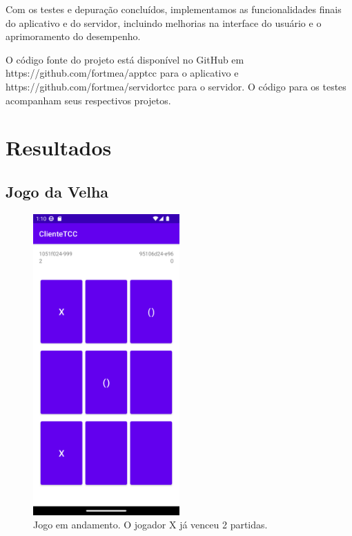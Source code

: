 \documentclass[12pt]{article}
\begin{document}
Com os testes e depuração concluídos, implementamos as funcionalidades finais do aplicativo e do servidor, incluindo melhorias na interface do usuário e o aprimoramento do desempenho.

O código fonte do projeto está disponível no GitHub em  https://github.com/fortmea/apptcc para o aplicativo e https://github.com/fortmea/servidortcc para o servidor. O código para os testes acompanham seus respectivos projetos.

\section{Resultados}
\subsection{Jogo da Velha}
\begin{figure}[ht]
\centering
\includegraphics[width=0.5\textwidth]{tela_jogo.png}
\caption{Jogo em andamento. O jogador X já venceu 2 partidas.}
\label{fig:jogofig1}
\end{figure}
\break
\end{document}
